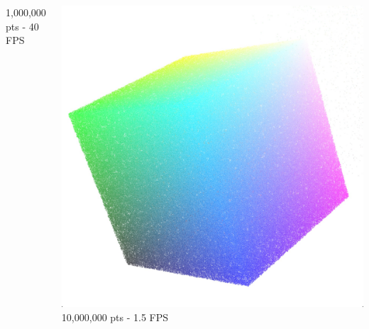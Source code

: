 \documentclass[10pt]{beamer}
\begin{document}
\begin{frame}
\begin{block}{}
\begin{columns}
\begin{column}{.225\textwidth}
\begin{center}
        \tiny 1,000,000 pts - 40 FPS
        \end{center}
      \end{column}
      \begin{column}{.225\textwidth}
        \begin{center}
        \includegraphics[width=\textwidth]{scatter-5}\\
        \tiny 10,000,000 pts - 1.5 FPS
        \end{center}
      \end{column}
    \end{columns}
  \end{block}


\end{frame}
\end{document}
